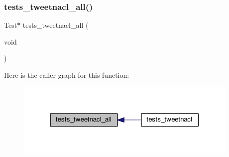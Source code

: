 \subsubsection{\texorpdfstring{tests\+\_\+tweetnacl\+\_\+all()}{tests\_tweetnacl\_all()}}
{\footnotesize\ttfamily Test$\ast$ tests\+\_\+tweetnacl\+\_\+all (\begin{DoxyParamCaption}\item[{void}]{ }\end{DoxyParamCaption})}

Here is the caller graph for this function\+:
\nopagebreak
\begin{figure}[H]
\begin{center}
\leavevmode
\includegraphics[width=303pt]{tests-tweetnacl_8c_a8edb7617bfd6d191935978409d6c766c_icgraph}
\end{center}
\end{figure}
